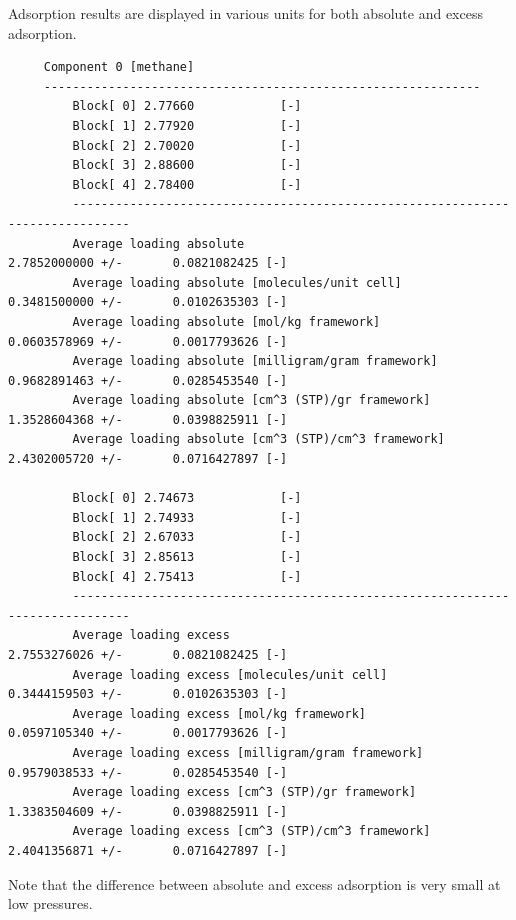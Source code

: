 \noindent
Adsorption results are displayed in various units for both absolute and excess adsorption.
\begin{tiny}
\begin{verbatim}
     Component 0 [methane]
     -------------------------------------------------------------
         Block[ 0] 2.77660            [-]
         Block[ 1] 2.77920            [-]
         Block[ 2] 2.70020            [-]
         Block[ 3] 2.88600            [-]
         Block[ 4] 2.78400            [-]
         ------------------------------------------------------------------------------
         Average loading absolute                              2.7852000000 +/-       0.0821082425 [-]
         Average loading absolute [molecules/unit cell]        0.3481500000 +/-       0.0102635303 [-]
         Average loading absolute [mol/kg framework]                  0.0603578969 +/-       0.0017793626 [-]
         Average loading absolute [milligram/gram framework]          0.9682891463 +/-       0.0285453540 [-]
         Average loading absolute [cm^3 (STP)/gr framework]           1.3528604368 +/-       0.0398825911 [-]
         Average loading absolute [cm^3 (STP)/cm^3 framework]         2.4302005720 +/-       0.0716427897 [-]
     
         Block[ 0] 2.74673            [-]
         Block[ 1] 2.74933            [-]
         Block[ 2] 2.67033            [-]
         Block[ 3] 2.85613            [-]
         Block[ 4] 2.75413            [-]
         ------------------------------------------------------------------------------
         Average loading excess                              2.7553276026 +/-       0.0821082425 [-]
         Average loading excess [molecules/unit cell]        0.3444159503 +/-       0.0102635303 [-]
         Average loading excess [mol/kg framework]                    0.0597105340 +/-       0.0017793626 [-]
         Average loading excess [milligram/gram framework]            0.9579038533 +/-       0.0285453540 [-]
         Average loading excess [cm^3 (STP)/gr framework]             1.3383504609 +/-       0.0398825911 [-]
         Average loading excess [cm^3 (STP)/cm^3 framework]           2.4041356871 +/-       0.0716427897 [-]
\end{verbatim}
\end{tiny}
Note that the difference between absolute and excess adsorption is very small at low pressures.

